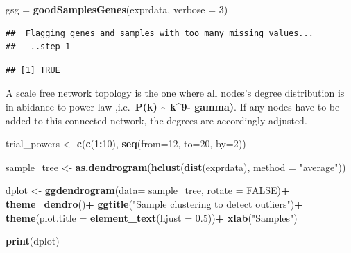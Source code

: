 \documentclass[]{article}
\newenvironment{Shaded}{\begin{snugshade}}{\end{snugshade}}
\newcommand{\DataTypeTok}[1]{\textcolor[rgb]{0.13,0.29,0.53}{#1}}
\newcommand{\DecValTok}[1]{\textcolor[rgb]{0.00,0.00,0.81}{#1}}
\newcommand{\FloatTok}[1]{\textcolor[rgb]{0.00,0.00,0.81}{#1}}
\newcommand{\KeywordTok}[1]{\textcolor[rgb]{0.13,0.29,0.53}{\textbf{#1}}}
\newcommand{\NormalTok}[1]{#1}
\newcommand{\OperatorTok}[1]{\textcolor[rgb]{0.81,0.36,0.00}{\textbf{#1}}}
\newcommand{\OtherTok}[1]{\textcolor[rgb]{0.56,0.35,0.01}{#1}}
\newcommand{\StringTok}[1]{\textcolor[rgb]{0.31,0.60,0.02}{#1}}
\begin{document}
\begin{Shaded}
\begin{Highlighting}[]
\NormalTok{gsg =}\StringTok{ }\KeywordTok{goodSamplesGenes}\NormalTok{(exprdata, }\DataTypeTok{verbose =} \DecValTok{3}\NormalTok{)}
\end{Highlighting}
\end{Shaded}

\begin{verbatim}
##  Flagging genes and samples with too many missing values...
##   ..step 1
\end{verbatim}

\begin{Shaded}
\end{Shaded}

\begin{verbatim}
## [1] TRUE
\end{verbatim}

A scale free network topology is the one where all nodes's degree
distribution is in abidance to power law ,i.e.~\textbf{P(k)
\textasciitilde{} k\^{}9- gamma)}. If any nodes have to be added to this
connected network, the degrees are accordingly adjusted.

\begin{Shaded}
\begin{Highlighting}[]
\NormalTok{trial_powers <-}\StringTok{ }\KeywordTok{c}\NormalTok{(}\KeywordTok{c}\NormalTok{(}\DecValTok{1}\OperatorTok{:}\DecValTok{10}\NormalTok{), }\KeywordTok{seq}\NormalTok{(}\DataTypeTok{from=}\DecValTok{12}\NormalTok{, }\DataTypeTok{to=}\DecValTok{20}\NormalTok{, }\DataTypeTok{by=}\DecValTok{2}\NormalTok{))}
\end{Highlighting}
\end{Shaded}

\begin{Shaded}
\begin{Highlighting}[]
\NormalTok{sample_tree <-}\StringTok{ }\KeywordTok{as.dendrogram}\NormalTok{(}\KeywordTok{hclust}\NormalTok{(}\KeywordTok{dist}\NormalTok{(exprdata), }\DataTypeTok{method =} \StringTok{"average"}\NormalTok{))}

\NormalTok{dplot <-}\StringTok{ }\KeywordTok{ggdendrogram}\NormalTok{(}\DataTypeTok{data=}\NormalTok{ sample_tree, }\DataTypeTok{rotate =} \OtherTok{FALSE}\NormalTok{)}\OperatorTok{+}
\StringTok{  }\KeywordTok{theme_dendro}\NormalTok{()}\OperatorTok{+}
\StringTok{  }\KeywordTok{ggtitle}\NormalTok{(}\StringTok{"Sample clustering to detect outliers"}\NormalTok{)}\OperatorTok{+}
\StringTok{  }\KeywordTok{theme}\NormalTok{(}\DataTypeTok{plot.title =} \KeywordTok{element_text}\NormalTok{(}\DataTypeTok{hjust =} \FloatTok{0.5}\NormalTok{))}\OperatorTok{+}
\StringTok{  }\KeywordTok{xlab}\NormalTok{(}\StringTok{"Samples"}\NormalTok{)}

\KeywordTok{print}\NormalTok{(dplot)}
\end{Highlighting}
\end{Shaded}
\end{document}
